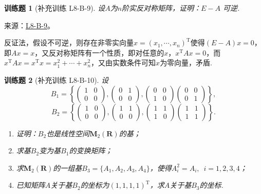 \documentclass[12pt,fontset=fandol]{ctexart}
\newtheorem{exercise}{训练题}[section]
\begin{document}
\begin{exercise}[补充训练 L8-B-9]\label{prob:L8-B-9}
设$A$为$n$阶实反对称矩阵，证明：$E-A$ 可逆.
\end{exercise}
\noindent 来源：\href{https://github.com/yhwu-is/Linear-Algebra-Left-Undone/blob/new/%E8%AE%B2%E4%B9%89/%E4%B8%93%E9%A2%98/8%20%E7%9B%B8%E6%8A%B5%E6%A0%87%E5%87%86%E5%BD%A2.tex}{L8-B-9}。
\begin{solve}
反证法，假设不可逆，则存在非零实向量$x=(x_1,\cdots,x_n)^\mathrm{T}$使得$(E-A)x=0$，即$Ax=x$，又反对称矩阵有一个性质，即对任意的$x$，$x^\mathrm{T}Ax=0$，而$x^\mathrm{T}Ax=x^\mathrm{T}x=x_1^2+\cdots+x_n^2$，又由实数条件可知$x$为零向量，矛盾.
\end{solve}

\begin{exercise}[补充训练 L8-B-10]\label{prob:L8-B-10}
设
        \[B_1=\left\{\begin{pmatrix}
                1 & 0 \\ 0 & 0
            \end{pmatrix},\begin{pmatrix}
                0 & 1 \\ 0 & 0
            \end{pmatrix},\begin{pmatrix}
                0 & 0 \\ 1 & 0
            \end{pmatrix}\begin{pmatrix}
                0 & 0 \\ 0 & 1
            \end{pmatrix}\right\},\]
        \[B_2=\left\{\begin{pmatrix}
                1 & 0 \\ 0 & 0
            \end{pmatrix},\begin{pmatrix}
                1 & 1 \\ 0 & 0
            \end{pmatrix},\begin{pmatrix}
                1 & 1 \\ 1 & 0
            \end{pmatrix}\begin{pmatrix}
                1 & 1 \\ 1 & 1
            \end{pmatrix}\right\}.\]
        \begin{enumerate}
            \item 证明：$B_2$也是线性空间$\mathbf{M}_2(\mathbf{R})$的基；

            \item 求基$B_2$变为基$B_1$的变换矩阵；

            \item 求$\mathbf{M}_2(\mathbf{R})$的一组基$B_3=\{A_1,A_2,A_3,A_4\}$，使得$A_i^2=A_i,\enspace i=1,2,3,4$；

            \item 已知矩阵$A$关于基$B_2$的坐标为$(1,1,1,1)^\mathrm{T}$，求$A$关于基$B_3$的坐标.
        \end{enumerate}
\end{exercise}
\end{document}
